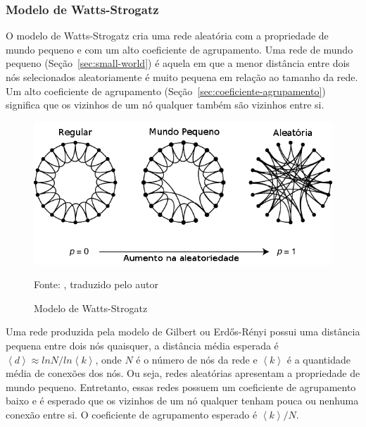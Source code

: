 \documentclass[12pt,a4paper,final]{article}
\newcommand{\avg}[1]{\left\langle #1 \right\rangle} %
\newcommand{\source}[1]{\vspace{-10pt} \caption*{Fonte: {#1}} }
\begin{document}
\subsubsection{Modelo de Watts-Strogatz}

O modelo de Watts-Strogatz cria uma rede aleatória com a propriedade de mundo pequeno e com um alto coeficiente de agrupamento. Uma rede de mundo pequeno (Seção~\ref{sec:small-world}) é aquela em que a menor distância entre dois nós selecionados aleatoriamente é muito pequena em relação ao tamanho da rede. Um alto coeficiente de agrupamento (Seção~\ref{sec:coeficiente-agrupamento}) significa que os vizinhos de um nó qualquer também são vizinhos entre si.

\begin{figure}[ht]
    \centering
    \includegraphics[scale=0.6]{small-world.png}
    \caption{Modelo de Watts-Strogatz}
    \source{, traduzido pelo autor}
\end{figure}    

Uma rede produzida pela modelo de Gilbert ou Erdős-Rényi possui uma distância pequena entre dois nós quaisquer, a distância média esperada é $\avg{d} \approx ln N / ln \avg{k}$, onde $N$ é o número de nós da rede e $\avg{k}$ é a quantidade média de conexões dos nós. Ou seja, redes aleatórias apresentam a propriedade de mundo pequeno. Entretanto, essas redes possuem um coeficiente de agrupamento baixo e é esperado que os vizinhos de um nó qualquer tenham pouca ou nenhuma conexão entre si. O coeficiente de agrupamento esperado é $\avg{k}/N$.
\end{document}
